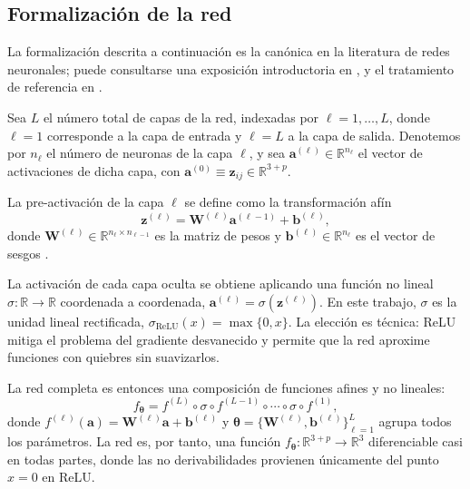 \subsection{Formalizaci\'on de la red}
\label{subsec:mlp_arquitectura}

La formalizaci\'on descrita a continuaci\'on es la can\'onica en la literatura de redes neuronales; puede consultarse una exposici\'on introductoria en \cite{solorzano2025rn}, y el tratamiento de referencia en \cite{Charu2018}.

Sea $L$ el n\'umero total de capas de la red, indexadas por $\ell = 1, \dots, L$, donde $\ell = 1$ corresponde a la capa de entrada y $\ell = L$ a la capa de salida. Denotemos por $n_\ell$ el n\'umero de neuronas de la capa $\ell$, y sea $\mathbf{a}^{(\ell)} \in \mathbb{R}^{n_\ell}$ el vector de activaciones de dicha capa, con $\mathbf{a}^{(0)} \equiv \mathbf{z}_{ij} \in \mathbb{R}^{3+p}$.

\begin{definition}
	La pre-activaci\'on de la capa $\ell$ se define como la transformaci\'on af\'in
	\begin{equation}\label{eq:mlp_preact}
		\mathbf{z}^{(\ell)} = \boldsymbol{W}^{(\ell)} \mathbf{a}^{(\ell-1)} + \mathbf{b}^{(\ell)},
	\end{equation}
	donde $\boldsymbol{W}^{(\ell)} \in \mathbb{R}^{n_\ell \times n_{\ell-1}}$ es la matriz de pesos y $\mathbf{b}^{(\ell)} \in \mathbb{R}^{n_\ell}$ es el vector de sesgos  \cite{Charu2018}.
\end{definition}

La activaci\'on de cada capa oculta se obtiene aplicando una funci\'on no lineal $\sigma: \mathbb{R} \to \mathbb{R}$ coordenada a coordenada, $\mathbf{a}^{(\ell)} = \sigma(\mathbf{z}^{(\ell)})$. En este trabajo, $\sigma$ es la unidad lineal rectificada, $\sigma_{\mathrm{ReLU}}(x) = \max\{0, x\}$. La elecci\'on es t\'ecnica: ReLU mitiga el problema del gradiente desvanecido y permite que la red aproxime funciones con quiebres sin suavizarlos.

La red completa es entonces una composici\'on de funciones afines y no lineales:
\begin{equation}\label{eq:mlp_composicion}
	f_{\boldsymbol{\theta}} = f^{(L)} \circ \sigma \circ f^{(L-1)} \circ \cdots \circ \sigma \circ f^{(1)},
\end{equation}
donde $f^{(\ell)}(\mathbf{a}) = \boldsymbol{W}^{(\ell)} \mathbf{a} + \mathbf{b}^{(\ell)}$ y $\boldsymbol{\theta} = \{\boldsymbol{W}^{(\ell)}, \mathbf{b}^{(\ell)}\}_{\ell=1}^{L}$ agrupa todos los par\'ametros. La red es, por tanto, una funci\'on $f_{\boldsymbol{\theta}}: \mathbb{R}^{3+p} \to \mathbb{R}^3$ diferenciable casi en todas partes, donde las no derivabilidades provienen \'unicamente del punto $x=0$ en ReLU.

